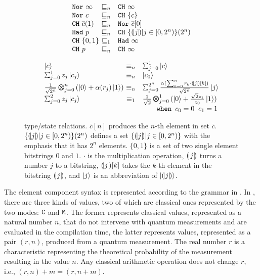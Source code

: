 \begin{figure}
{\small
{\hspace*{-6em}
\begin{minipage}[t]{0.4\textwidth}
\begin{center}
 \[
  \begin{array}{l@{~}cl}
  \tnor{\infty} &\sqsubseteq_n& \tch{\infty}\\
  \tnor{c} &\sqsubseteq_n& \tch{\{c\}}\\
  \tch{\overline{c}(1)} &\sqsubseteq_n& \tnor{\overline{c}[0]}\\
  \thad{p} &\sqsubseteq_n& \tch{\{\tos{j}|j\in[0,2^n)\}(2^n)}\\
  \tch{\{0,1\}} &\sqsubseteq_1& \thad{\infty}\\
  \tch{p} &\sqsubseteq_n& \tch{\infty}
    \end{array}
  \]
\end{center}
  \label{fig:qafny-subtype}
\end{minipage}
\qquad
\begin{minipage}[t]{0.45\textwidth}
\begin{center}
   \[
   \begin{array}{l@{~}cl}
  \ket{c} &\equiv_n& \sch{1}{ }{c}\\
  \sch{1}{z_j}{c_j} &\equiv_n& \ket{c_0}\\
  \shad{2^n}{n}{\alpha(r_j)} &\equiv_n& \sch{2^n}{\frac{\alpha(\sum_{k=0}^{n} r_k \cdot \tos{j}[k])}{\sqrt{2^n}}}{j}\\
  \sch{2}{z_j}{c_j} &\equiv_1& \shad{2}{1}{\frac{\sqrt{2}z_1}{z_0}}\\
   &&\qquad\texttt{when }c_0=0\;\;c_1=1
    \end{array}
 \]
\end{center}
  \label{fig:qafny-sequiv}
\end{minipage}
  \caption{\qafny type/state relations. $\overline{c}[n]$ produces the $n$-th element in set $\overline{c}$. $\{(\!| j |\!)|j\in[0,2^n)\}(2^n)$ defines a set $\{(\!| j |\!)|j\in[0,2^n)\}$ with the emphasis that it has $2^n$ elements. $\{0,1\}$ is a set of two single element bitstrings $0$ and $1$. $\cdot$ is the multiplication operation, $(\!| j |\!)$ turns a number $j$ to a bitstring, $(\!| j |\!)[k]$ takes the $k$-th element in the bitstring $(\!| j |\!)$, and $\left\vert{j}\right\rangle$ is an abbreviation of $\left\vert{(\!| j |\!)}\right\rangle$.}
  \label{fig:qafny-eq}
}
}
\end{figure}

The \qafny element component syntax is represented according to the grammar in . 
In \qafny, there are three kinds of values, two of which are classical ones represented by the two modes: $\texttt{C}$ and $\texttt{M}$.
The former represents classical values, represented as a natural number $n$, that do not intervene with quantum measurements and are evaluated in the compilation time, the latter represents values, represented as a pair $(r,n)$, produced from a quantum measurement. The real number $r$ is a characteristic representing the theoretical probability of the measurement resulting in the value $n$.
Any classical arithmetic operation does not change $r$, i.e., $(r,n)+m=(r,n+m)$. 


